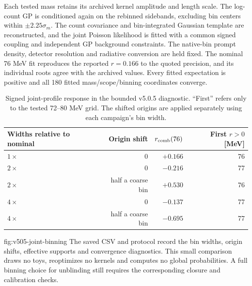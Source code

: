 Each tested mass retains its archived kernel amplitude and length scale.
The log-count GP is conditioned again on the rebinned sidebands, excluding
bin centers within $\pm2.25\sigma_m$. The count covariance and
bin-integrated Gaussian template are reconstructed, and the joint Poisson
likelihood is fitted with a common signed coupling and independent GP
background constraints. The native-bin prompt density, detector resolution
and radiative conversion are held fixed. The nominal 76 MeV fit reproduces
the reported $r=0.166$ to the quoted precision, and its individual roots
agree with the archived values. Every fitted expectation is positive and
all 180 fitted mass/scope/binning coordinates converge.

\begin{table}[htbp]\centering\small
\begin{tabular}{lrrr}\toprule
Widths relative to nominal & Origin shift & $r_{\rm comb}(76)$ & First $r>0$ [MeV]\\\midrule
$1\times$ & 0 & $+0.166$ & 76\\
$2\times$ & 0 & $-0.216$ & 77\\
$2\times$ & half a coarse bin & $+0.530$ & 76\\
$4\times$ & 0 & $-0.137$ & 77\\
$4\times$ & half a coarse bin & $-0.695$ & 77\\
\bottomrule\end{tabular}
\caption{Signed joint-profile response in the bounded v5.0.5 diagnostic.
``First'' refers only to the tested 72--80 MeV grid. The shifted origins
are applied separately using each campaign's bin width.}
\label{tab:v505-joint-binning}\end{table}

{fig:v505-joint-binning}
The saved CSV and protocol record the bin widths, origin shifts, effective
supports and convergence diagnostics. This small comparison draws no toys,
reoptimizes no kernels and computes no global probabilities. A full binning
choice for unblinding still requires the corresponding closure and
calibration checks.
